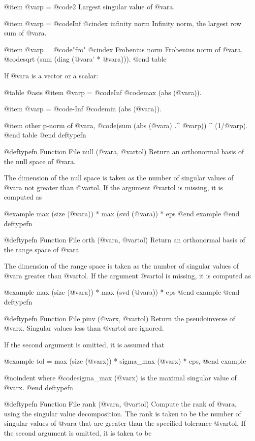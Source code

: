 @item @var{p} = @code{2}
Largest singular value of @var{a}.

@item @var{p} = @code{Inf}
@cindex infinity norm
Infinity norm, the largest row sum of @var{a}.

@item @var{p} = @code{"fro"}
@cindex Frobenius norm
Frobenius norm of @var{a}, @code{sqrt (sum (diag (@var{a}' * @var{a})))}.
@end table

If @var{a} is a vector or a scalar:

@table @asis
@item @var{p} = @code{Inf}
@code{max (abs (@var{a}))}.

@item @var{p} = @code{-Inf}
@code{min (abs (@var{a}))}.

@item other
p-norm of @var{a}, @code{(sum (abs (@var{a}) .^ @var{p})) ^ (1/@var{p})}.
@end table
@end deftypefn

@deftypefn {Function File} {} null (@var{a}, @var{tol})
Return an orthonormal basis of the null space of @var{a}.

The dimension of the null space is taken as the number of singular
values of @var{a} not greater than @var{tol}.  If the argument @var{tol}
is missing, it is computed as

@example
max (size (@var{a})) * max (svd (@var{a})) * eps
@end example
@end deftypefn

@deftypefn {Function File} {} orth (@var{a}, @var{tol})
Return an orthonormal basis of the range space of @var{a}.

The dimension of the range space is taken as the number of singular
values of @var{a} greater than @var{tol}.  If the argument @var{tol} is
missing, it is computed as

@example
max (size (@var{a})) * max (svd (@var{a})) * eps
@end example
@end deftypefn

@deftypefn {Function File} {} pinv (@var{x}, @var{tol})
Return the pseudoinverse of @var{x}.  Singular values less than
@var{tol} are ignored. 

If the second argument is omitted, it is assumed that

@example
tol = max (size (@var{x})) * sigma_max (@var{x}) * eps,
@end example

@noindent
where @code{sigma_max (@var{x})} is the maximal singular value of @var{x}.
@end deftypefn

@deftypefn {Function File} {} rank (@var{a}, @var{tol})
Compute the rank of @var{a}, using the singular value decomposition.
The rank is taken to be the number  of singular values of @var{a} that
are greater than the specified tolerance @var{tol}.  If the second
argument is omitted, it is taken to be

